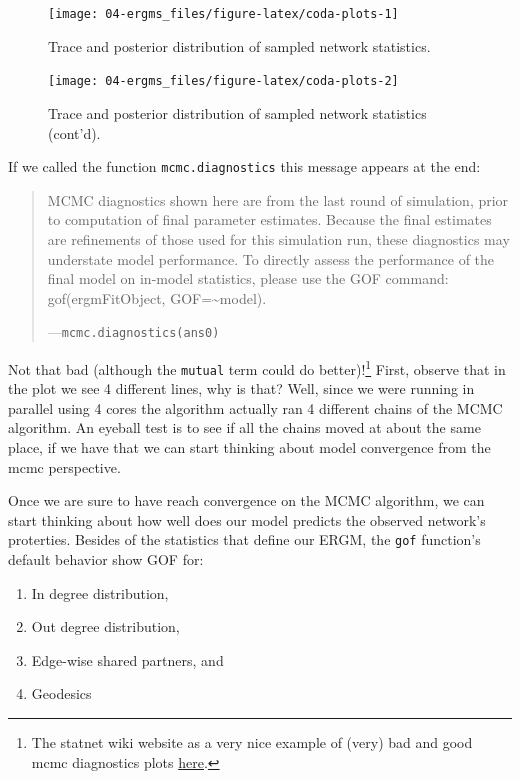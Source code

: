 \documentclass[
]{book}
\providecommand{\tightlist}{%
  \setlength{\itemsep}{0pt}\setlength{\parskip}{0pt}}
\begin{document}
\begin{figure}[!h]

{\centering \texttt{[image: 04-ergms\_files/figure-latex/coda-plots-1]} 

}

\caption{Trace and posterior distribution of sampled network statistics.}\label{fig:coda-plots-1}
\end{figure}
\begin{figure}[!h]

{\centering \texttt{[image: 04-ergms\_files/figure-latex/coda-plots-2]} 

}

\caption{Trace and posterior distribution of sampled network statistics (cont'd).}\label{fig:coda-plots-2}
\end{figure}

If we called the function \texttt{mcmc.diagnostics} this message appears at the end:

\begin{quote}
MCMC diagnostics shown here are from the last round of simulation, prior to computation of final parameter estimates. Because the final estimates are refinements of those used for this simulation run, these diagnostics may understate model performance. To directly assess the performance of the final model on in-model statistics, please use the GOF command: gof(ergmFitObject, GOF=\textasciitilde model).

---\texttt{mcmc.diagnostics(ans0)}
\end{quote}

Not that bad (although the \texttt{mutual} term could do better)!\footnote{The statnet wiki website as a very nice example of (very) bad and good mcmc diagnostics plots \href{https://statnet.org/trac/raw-attachment/wiki/Resources/ergm.fit.diagnostics.pdf}{here}.} First, observe that in the plot we see 4 different lines, why is that? Well, since we were running in parallel using 4 cores the algorithm actually ran 4 different chains of the MCMC algorithm. An eyeball test is to see if all the chains moved at about the same place, if we have that we can start thinking about model convergence from the mcmc perspective.

Once we are sure to have reach convergence on the MCMC algorithm, we can start thinking about how well does our model predicts the observed network's proterties. Besides of the statistics that define our ERGM, the \texttt{gof} function's default behavior show GOF for:

\begin{enumerate}
\def\labelenumi{\alph{enumi}.}
\tightlist
\item
  In degree distribution,
\item
  Out degree distribution,
\item
  Edge-wise shared partners, and
\item
  Geodesics
\end{enumerate}
\end{document}
